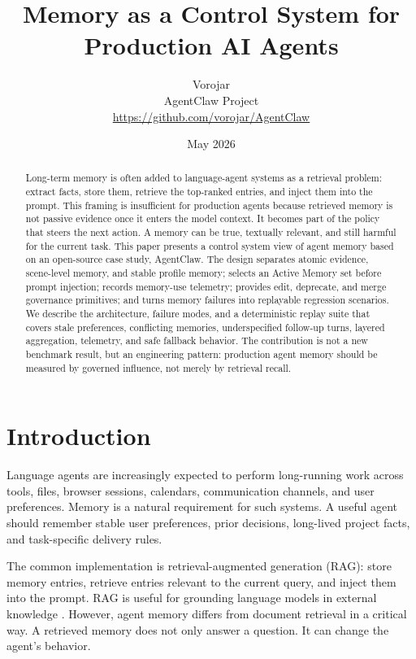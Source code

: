 \documentclass[11pt]{article}
\title{Memory as a Control System for Production AI Agents}
\author{
  Vorojar\\
  AgentClaw Project\\
  \url{https://github.com/vorojar/AgentClaw}
}
\date{May 2026}
\begin{document}
\maketitle

\begin{abstract}
Long-term memory is often added to language-agent systems as a retrieval problem:
extract facts, store them, retrieve the top-ranked entries, and inject them into
the prompt. This framing is insufficient for production agents because retrieved
memory is not passive evidence once it enters the model context. It becomes part
of the policy that steers the next action. A memory can be true, textually
relevant, and still harmful for the current task. This paper presents a control
system view of agent memory based on an open-source case study, AgentClaw. The
design separates atomic evidence, scene-level memory, and stable profile memory;
selects an Active Memory set before prompt injection; records memory-use
telemetry; provides edit, deprecate, and merge governance primitives; and turns
memory failures into replayable regression scenarios. We describe the
architecture, failure modes, and a deterministic replay suite that covers stale
preferences, conflicting memories, underspecified follow-up turns, layered
aggregation, telemetry, and safe fallback behavior. The contribution is not a
new benchmark result, but an engineering pattern: production agent memory should
be measured by governed influence, not merely by retrieval recall.
\end{abstract}

\section{Introduction}

Language agents are increasingly expected to perform long-running work across
tools, files, browser sessions, calendars, communication channels, and user
preferences. Memory is a natural requirement for such systems. A useful agent
should remember stable user preferences, prior decisions, long-lived project
facts, and task-specific delivery rules.

The common implementation is retrieval-augmented generation (RAG): store memory
entries, retrieve entries relevant to the current query, and inject them into the
prompt. RAG is useful for grounding language models in external knowledge
\cite{lewis2020rag}. However, agent memory differs from document retrieval in a
critical way. A retrieved memory does not only answer a question. It can change
the agent's behavior.
\end{document}
